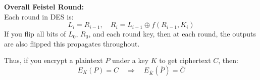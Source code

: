 \documentclass[12pt]{article}
\begin{document}
\textbf{Overall Feistel Round:} \\
Each round in DES is:
\[
L_i = R_{i-1}, \quad R_i = L_{i-1} \oplus f(R_{i-1}, K_i)
\]
If you flip all bits of \( L_0 \), \( R_0 \), and each round key, then at each round, the outputs are also flipped this propagates throughout.

Thus, if you encrypt a plaintext \( P \) under a key \( K \) to get ciphertext \( C \), then:
\[
E_K(P) = C \quad \Rightarrow \quad E_{\overline{K}}(\overline{P}) = \overline{C}
\]
\end{document}

